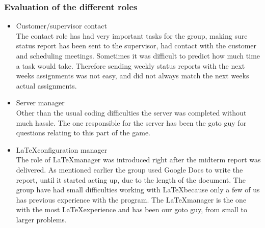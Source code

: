 \subsubsection{Evaluation of the different roles}
\begin{itemize} \setlength{\itemsep}{0cm}\setlength{\parskip}{0cm}
	\item Customer/supervisor contact \\
	The contact role has had very important tasks for the group, making sure status report has been sent to the supervisor,  had contact with the customer and scheduling meetings. Sometimes it was difficult to predict how much time a task would take. Therefore sending weekly status reports with the next weeks assignments was not easy, and did not always match the next weeks actual assignments.
	\item Server manager\\
Other than the usual coding difficulties the server was completed without much hassle. The one responsible for the server has been the goto guy for questions relating to this part of the game.
	\item \LaTeX configuration manager\\
The role of \LaTeX manager was introduced right after the midterm report was delivered. As mentioned earlier the group used Google Docs to write the report, until it started acting up, due to the length of the document. The group have had small difficulties working with \LaTeX because only a few of us has previous experience with the program. The \LaTeX manager is the one with the most \LaTeX experience and has been our goto guy, from small to larger problems.


\end{itemize}
